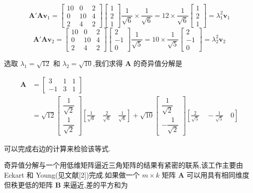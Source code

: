 \[
\bm{A}'\bm{A}\bm{v}_1 = \begin{bmatrix} 10 & 0 & 2 \\ 0 & 10 & 4 \\ 2 & 4 & 2 \end{bmatrix}\begin{bmatrix} 1 \\ 2 \\ 1 \end{bmatrix}\frac{1}{\sqrt{6}} \times \frac{1}{\sqrt{6}} = 12 \times \frac{1}{\sqrt{6}}\begin{bmatrix} 1 \\ 2 \\ 1 \end{bmatrix} = \lambda_1^2\bm{v}_1
\]
\[
\bm{A}'\bm{A}\bm{v}_2 = \begin{bmatrix} 10 & 0 & 2 \\ 0 & 10 & 4 \\ 2 & 4 & 2 \end{bmatrix}\begin{bmatrix} 2 \\ -1 \\ 0 \end{bmatrix}\frac{1}{\sqrt{5}} = 10 \times \frac{1}{\sqrt{5}}\begin{bmatrix} 2 \\ -1 \\ 0 \end{bmatrix} = \lambda_2^2\bm{v}_2
\]

选取 $\lambda_1 = \sqrt{12}$ 和 $\lambda_2 = \sqrt{10}$,我们求得 $\bm{A}$ 的奇异值分解是

\begin{equation*}
\begin{aligned}
\bm{A} &= \begin{bmatrix} 3 & 1 & 1 \\ -1 & 3 & 1 \end{bmatrix} \\
&= \sqrt{12}\begin{bmatrix} \dfrac{1}{\sqrt{2}} \\[2mm] \dfrac{1}{\sqrt{2}} \end{bmatrix}\left[\frac{1}{\sqrt{6}} \quad \frac{2}{\sqrt{6}} \quad \frac{1}{\sqrt{6}}\right] + \sqrt{10}\begin{bmatrix} \dfrac{1}{\sqrt{2}} \\[2mm] -\dfrac{1}{\sqrt{2}} \end{bmatrix}\left[\frac{2}{\sqrt{5}} \quad -\frac{1}{\sqrt{5}} \quad 0\right]
\end{aligned}
\end{equation*}

可以完成右边的计算来检验该等式.

奇异值分解与一个用低维矩阵逼近三角矩阵的结果有紧密的联系,该工作主要由 Eckart 和 Young(见文献[2])完成.如果做一个 $m \times k$ 矩阵 $\bm{A}$ 可以用具有相同维度但秩更低的矩阵 $\bm{B}$ 来逼近,差的平方和为
